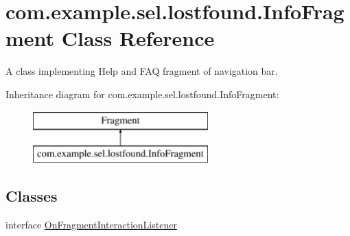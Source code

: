 \hypertarget{classcom_1_1example_1_1sel_1_1lostfound_1_1InfoFragment}{}\section{com.\+example.\+sel.\+lostfound.\+Info\+Fragment Class Reference}
\label{classcom_1_1example_1_1sel_1_1lostfound_1_1InfoFragment}


A class implementing Help and F\+AQ fragment of navigation bar.  


Inheritance diagram for com.\+example.\+sel.\+lostfound.\+Info\+Fragment\+:\begin{figure}[H]
\begin{center}
\leavevmode
\includegraphics[height=2.000000cm]{classcom_1_1example_1_1sel_1_1lostfound_1_1InfoFragment}
\end{center}
\end{figure}
\subsection*{Classes}
\begin{DoxyCompactItemize}
\item 
interface \hyperlink{interfacecom_1_1example_1_1sel_1_1lostfound_1_1InfoFragment_1_1OnFragmentInteractionListener}{On\+Fragment\+Interaction\+Listener}
\end{DoxyCompactItemize}
